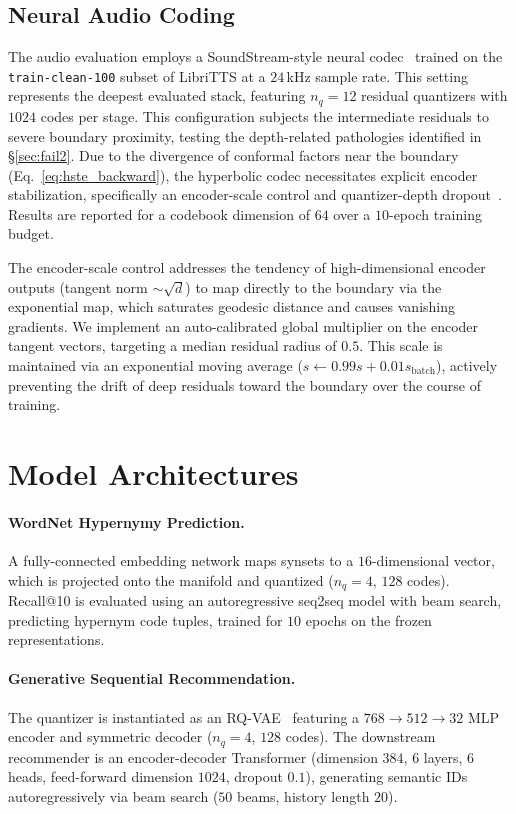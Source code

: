 \documentclass[12pt]{report}
\begin{document}
\subsection{Neural Audio Coding}
\label{sec:tasks_audio}
The audio evaluation employs a SoundStream-style neural codec~\cite{soundstream,encodec} trained on the \texttt{train-clean-100} subset of LibriTTS at a $24$\,kHz sample rate. This setting represents the deepest evaluated stack, featuring $n_q=12$ residual quantizers with $1024$ codes per stage. This configuration subjects the intermediate residuals to severe boundary proximity, testing the depth-related pathologies identified in \S\ref{sec:fail2}. Due to the divergence of conformal factors near the boundary (Eq.~\ref{eq:hste_backward}), the hyperbolic codec necessitates explicit encoder stabilization, specifically an encoder-scale control and quantizer-depth dropout~\cite{soundstream}. Results are reported for a codebook dimension of $64$ over a $10$-epoch training budget.

The encoder-scale control addresses the tendency of high-dimensional encoder outputs (tangent norm $\sim\!\sqrt{d}$) to map directly to the boundary via the exponential map, which saturates geodesic distance and causes vanishing gradients. We implement an auto-calibrated global multiplier on the encoder tangent vectors, targeting a median residual radius of $0.5$. This scale is maintained via an exponential moving average ($s \leftarrow 0.99s + 0.01s_{\text{batch}}$), actively preventing the drift of deep residuals toward the boundary over the course of training.

\section{Model Architectures}
\label{sec:models}

\paragraph{WordNet Hypernymy Prediction.} A fully-connected embedding network maps synsets to a $16$-dimensional vector, which is projected onto the manifold and quantized ($n_q=4$, $128$ codes). Recall@10 is evaluated using an autoregressive seq2seq model with beam search, predicting hypernym code tuples, trained for $10$ epochs on the frozen representations.

\paragraph{Generative Sequential Recommendation.} The quantizer is instantiated as an RQ-VAE~\cite{lee2022rqvae,hrqvae} featuring a $768\!\to\!512\!\to\!32$ MLP encoder and symmetric decoder ($n_q=4$, $128$ codes). The downstream recommender is an encoder-decoder Transformer (dimension $384$, $6$ layers, $6$ heads, feed-forward dimension $1024$, dropout $0.1$), generating semantic IDs autoregressively via beam search ($50$ beams, history length $20$).
\end{document}
